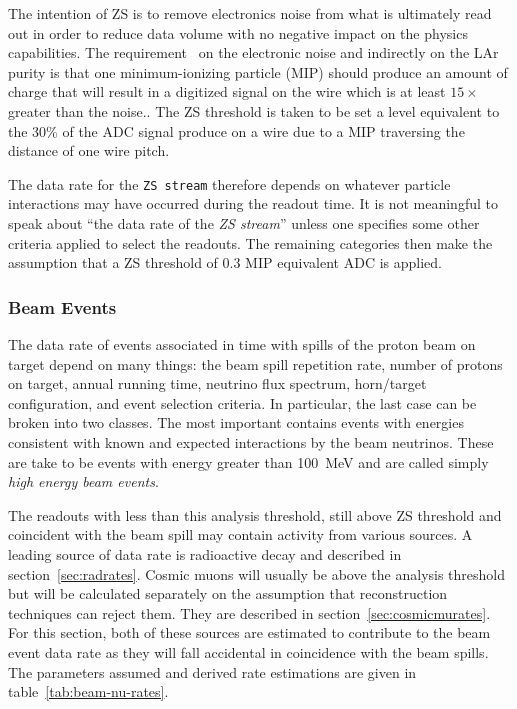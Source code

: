 The intention of ZS is to remove electronics noise from what is
ultimately read out in order to reduce data volume with no negative
impact on the physics capabilities.
The requirement~\cite{docdb3383} on the electronic noise and
indirectly on the LAr purity is that one minimum-ionizing particle
(MIP) should produce an amount of charge that will result in a
digitized signal on the wire which is at least $15\times$ greater than
the noise..
The ZS threshold is taken to be set a level equivalent to the 30\% of
the ADC signal produce on a wire due to a MIP traversing the distance
of one wire pitch.

The data rate for the \texttt{ZS stream} therefore depends on whatever
particle interactions may have occurred during the readout time.
It is not meaningful to speak about ``the data rate of the \textit{ZS
  stream}'' unless one specifies some other criteria applied to select
the readouts.
The remaining categories then make the assumption that a ZS threshold
of \num{0.3} MIP equivalent ADC is applied.

\subsubsection{Beam Events}

The data rate of events associated in time with spills of the proton
beam on target depend on many things: the beam spill repetition rate,
number of protons on target, annual running time, neutrino flux
spectrum, horn/target configuration, and event selection criteria.
In particular, the last case can be broken into two classes.
The most important contains events with energies consistent with known
and expected interactions by the beam neutrinos.
These are take to be events with energy greater than \SI{100}{\MeV}
and are called simply \textit{high energy beam events}.

The readouts with less than this analysis threshold, still above ZS
threshold and coincident with the beam spill may contain activity from
various sources.
A leading source of data rate is radioactive decay and described in
section~\ref{sec:radrates}.
Cosmic muons will usually be above the analysis threshold but will be
calculated separately on the assumption that reconstruction techniques
can reject them.
They are described in section~\ref{sec:cosmicmurates}.
For this section, both of these sources are estimated to contribute to
the beam event data rate as they will fall accidental in coincidence
with the beam spills.
The parameters assumed and derived rate estimations are given in
table~\ref{tab:beam-nu-rates}.


